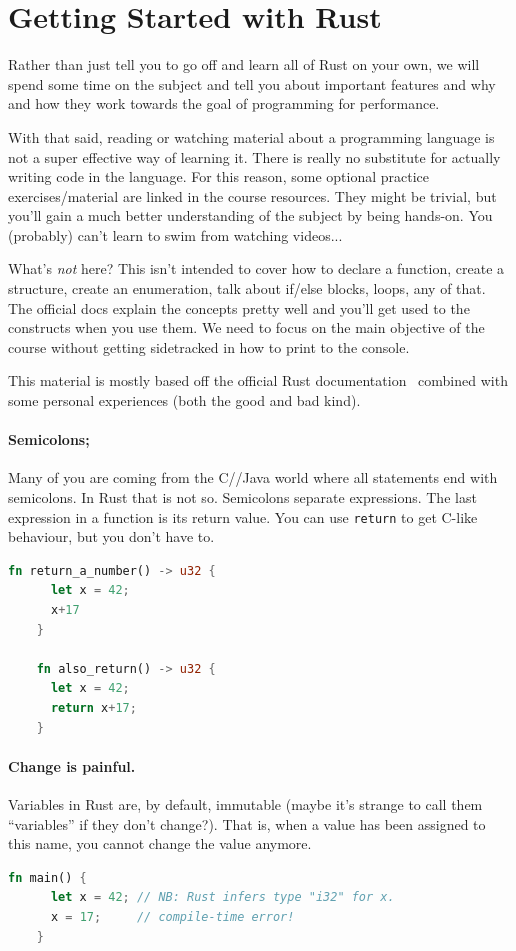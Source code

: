 




\section*{Getting Started with Rust}
Rather than just tell you to go off and learn all of Rust on your own, we will spend some time on the subject and tell you about important features and why and how they work towards the goal of programming for performance.

With that said, reading or watching material about a programming language is not a super effective way of learning it. There is really no substitute for actually writing code in the language. For this reason, some optional practice exercises/material are linked in the course resources. They might be trivial, but you'll gain a much better understanding of the subject by being hands-on. You (probably) can't learn to swim from watching videos...

What's \textit{not} here? This isn't intended to cover how to declare a function, create a structure, create an enumeration, talk about if/else blocks, loops, any of that. The official docs explain the concepts pretty well and you'll get used to the constructs when you use them. We need to focus on the main objective of the course without getting sidetracked in how to print to the console. 

This material is mostly based off the official Rust documentation~\cite{rustdocs} combined with some personal experiences (both the good and bad kind). 

\paragraph{Semicolons;} Many of you are coming from the C/\CPP/Java world where all statements end with semicolons. In Rust that is
not so. Semicolons separate expressions. The last expression in a function is its return value. You can use \texttt{return} to get
C-like behaviour, but you don't have to.
\begin{lstlisting}[language=Rust]
    fn return_a_number() -> u32 {
      let x = 42;
      x+17
    }

    fn also_return() -> u32 {
      let x = 42;
      return x+17;
    }
\end{lstlisting}

\paragraph{Change is painful.}
Variables in Rust are, by default, immutable (maybe it's strange to call them ``variables'' if they don't change?). That is, when a value has been assigned to this name, you cannot change the value anymore.
\begin{lstlisting}[language=Rust]
    fn main() {
      let x = 42; // NB: Rust infers type "i32" for x.
      x = 17;     // compile-time error!
    }
\end{lstlisting}

